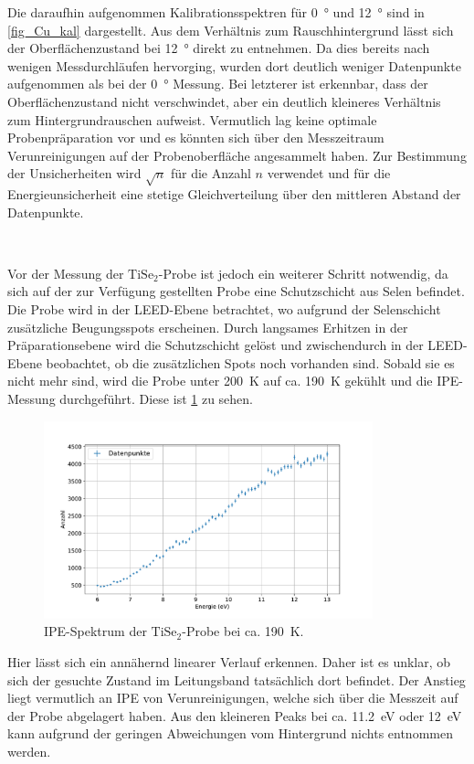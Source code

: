 Die daraufhin aufgenommen Kalibrationsspektren für \SI{0}{\degree} und \SI{12}{\degree} sind in \cref{fig_Cu_kal} dargestellt.
Aus dem Verhältnis zum Rauschhintergrund lässt sich der Oberflächenzustand bei \SI{12}{\degree} direkt zu entnehmen.
Da dies bereits nach wenigen Messdurchläufen hervorging, wurden dort deutlich weniger Datenpunkte aufgenommen als bei der \SI{0}{\degree} Messung.
Bei letzterer ist erkennbar, dass der Oberflächenzustand nicht verschwindet, aber ein deutlich kleineres Verhältnis zum Hintergrundrauschen aufweist.
Vermutlich lag keine optimale Probenpräparation vor und es könnten sich über den Messzeitraum Verunreinigungen auf der Probenoberfläche angesammelt haben.
Zur Bestimmung der Unsicherheiten wird $\sqrt{n}$ für die Anzahl $n$ verwendet und für die Energieunsicherheit eine stetige Gleichverteilung über den mittleren Abstand der Datenpunkte.

\

Vor der Messung der $\text{TiSe}_2$-Probe ist jedoch ein weiterer Schritt notwendig, da sich auf der zur Verfügung gestellten Probe eine Schutzschicht aus Selen befindet.
Die Probe wird in der LEED-Ebene betrachtet, wo aufgrund der Selenschicht zusätzliche Beugungsspots erscheinen.
Durch langsames Erhitzen in der Präparationsebene wird die Schutzschicht gelöst und zwischendurch in der LEED-Ebene beobachtet, ob die zusätzlichen Spots noch vorhanden sind.
Sobald sie es nicht mehr sind, wird die Probe unter \SI{200}{\kelvin} auf ca. \SI{190}{\kelvin} gekühlt und die IPE-Messung durchgeführt.
Diese ist \cref{fig_ipe_thighs2} zu sehen.
\begin{figure}[!ht]
    \centering
    \includegraphics[width=0.85\textwidth]{plots/TiSe2.pdf}
    \caption{IPE-Spektrum der $\text{TiSe}_2$-Probe bei ca. \SI{190}{\kelvin}.}
    \label{fig_ipe_thighs2}
\end{figure}
Hier lässt sich ein annähernd linearer Verlauf erkennen.
Daher ist es unklar, ob sich der gesuchte Zustand im Leitungsband tatsächlich dort befindet.
Der Anstieg liegt vermutlich an IPE von Verunreinigungen, welche sich über die Messzeit auf der Probe abgelagert haben.
Aus den kleineren Peaks bei ca. \SI{11.2}{\electronvolt} oder \SI{12}{\electronvolt} kann aufgrund der geringen Abweichungen vom Hintergrund nichts entnommen werden.

